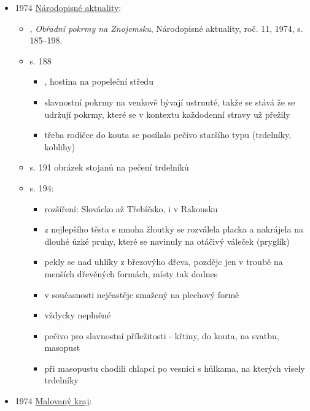 \begin{itemize}
  \begin{itemize}
  \tightlist
  \item
    Slovensko, slovníček nářečí kolem Senice
  \end{itemize}
\item
  1974
  \href{https://ceskadigitalniknihovna.cz/uuid/uuid:7c79b650-3b72-11e5-b57a-005056825209}{Národopisné
  aktuality}:

  \begin{itemize}
  \tightlist
  \item
     , \emph{Obřadní pokrmy na
    Znojemsku}, Národopisné aktuality, roč. 11, 1974, s. 185--198.
  \item
    s. 188

    \begin{itemize}
    \tightlist
    \item
       , hostina na popeleční středu
    \item
      slavnostní pokrmy na venkově bývají ustrnuté, takže se stává že se
      udržují pokrmy, které se v kontextu každodenní stravy už přežily
    \item
      třeba rodičce do kouta se posílalo pečivo staršího typu
      (trdelníky, koblihy)
    \end{itemize}
  \item
    s. 191 obrázek stojanů na pečení trdelníků
  \item
    s. 194:

    \begin{itemize}
    \tightlist
    \item
      rozšíření: Slovácko až Třebíčsko, i v Rakousku
    \item
      z nejlepšího těsta s mnoha žloutky se rozválela placka a nakrájela
      na dlouhé úzké pruhy, které se navinuly na otáčivý váleček
      (pryglík)
    \item
      pekly se nad uhlíky z březovýho dřeva, pozdějc jen v troubě na
      menších dřevěných formách, místy tak dodnes
    \item
      v současnosti nejčastějc smažený na plechový formě
    \item
      vždycky neplněné
    \item
      pečivo pro slavnostní příležitosti - křtiny, do kouta, na svatbu,
      masopust
    \item
      při masopustu chodili chlapci po vesnici s hůlkama, na kterých
      visely trdelníky
    \end{itemize}
  \end{itemize}
\item
  1974
  \href{https://ndk.cz/uuid/uuid:630185b0-f30f-11e3-a012-005056825209}{Malovaný
  kraj}:


\end{itemize}
